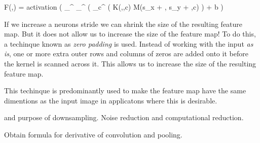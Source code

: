 \startplaceformula[reference=devel-feature-5]
\startformula
F(\color[red]{x},\color[red]{y})
=
{\rm activation}
\left( 
\sum_{\color[blue]{y}}^{}
\sum_{\color[blue]{x}}^{}
\left(
\sum_{c}^{}
\Bigl(
K(\color[blue]{x},\color[blue]{y},c)
\cdot
M(\color[red]{x}s_x + \color[blue]{x}, \color[red]{y}s_y + \color[blue]{y},c)
\right)
+
b
\right)
\stopformula
\stopplaceformula
\stopsubsubsection

\startsubsubsection[title=Zero padding]
If we increase a neurons stride we can shrink the size of the resulting feature map.
But it does not allow us to increase the size of the feature map!
To do this, a techinque known as {\em zero padding} is used.
Instead of working with the input {\em as is}, one or more extra outer rows and columns of zeros are added onto it before the kernel is scanned across it.
This allows us to increase the size of the resulting feature map.

This techinque is predominantly used to make the feature map have the same dimentions as the input image in applicatons where this is desirable.
\stopsubsubsection



 and purpose of downsampling.
Noise reduction and computational reduction.
\stopsubsection

\startsubsection[title=Backward Propagation]
Obtain formula for derivative of convolution and pooling.
\stopsubsection
\stopsection
